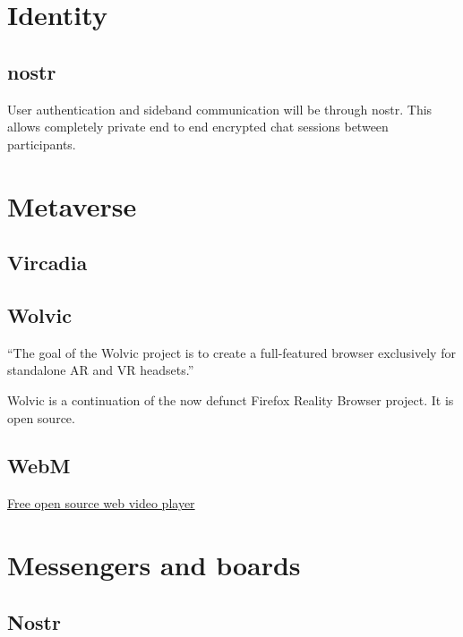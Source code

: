 



\lipsum[50]
\section{Identity}
\subsection{nostr}
User authentication and sideband communication will be through nostr. This allows completely private end to end encrypted chat sessions between participants.
\section{Metaverse}
\lipsum[50]
\subsection{Vircadia}
\lipsum[50]
\subsection{Wolvic}
``The goal of the Wolvic project is to create a full-featured browser exclusively for standalone AR and VR headsets.''\par
Wolvic is a continuation of the now defunct Firefox Reality Browser project. It is open source.
\subsection{WebM}
\href{https://www.webmproject.org/about/}{Free open source web video player}	
\lipsum[50]
\section{Messengers and boards}
\subsection{Nostr}
\lipsum[50]

